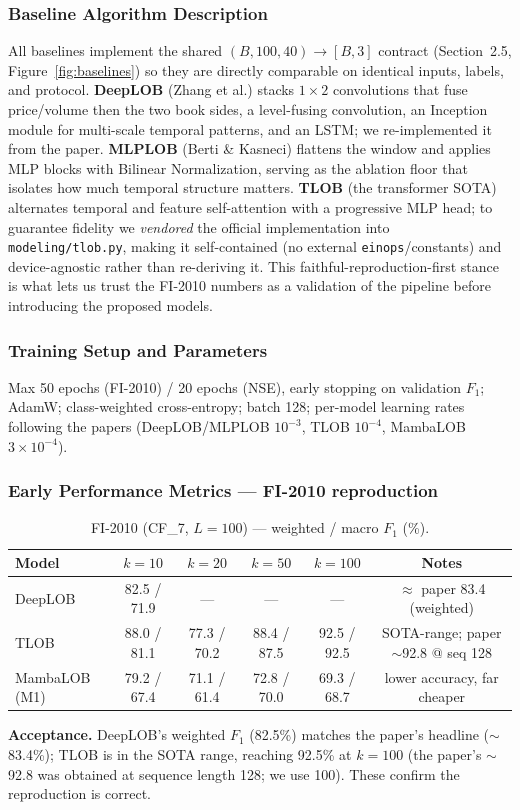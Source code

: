 \documentclass[11pt]{article}
\begin{document}
\subsubsection{Baseline Algorithm Description}
All baselines implement the shared $(B,100,40)\rightarrow[B,3]$ contract (Section~2.5, Figure~\ref{fig:baselines})
so they are directly comparable on identical inputs, labels, and protocol. \textbf{DeepLOB} (Zhang et al.)
stacks $1\times2$ convolutions that fuse price/volume then the two book sides, a level-fusing convolution, an
Inception module for multi-scale temporal patterns, and an LSTM; we re-implemented it from the paper.
\textbf{MLPLOB} (Berti \& Kasneci) flattens the window and applies MLP blocks with Bilinear Normalization,
serving as the ablation floor that isolates how much temporal structure matters. \textbf{TLOB} (the
transformer SOTA) alternates temporal and feature self-attention with a progressive MLP head; to guarantee
fidelity we \emph{vendored} the official implementation into \texttt{modeling/tlob.py}, making it
self-contained (no external \texttt{einops}/constants) and device-agnostic rather than re-deriving it. This
faithful-reproduction-first stance is what lets us trust the FI-2010 numbers as a validation of the pipeline
before introducing the proposed models.

\subsubsection{Training Setup and Parameters}
Max 50 epochs (FI-2010) / 20 epochs (NSE), early stopping on validation $F_1$; AdamW; class-weighted
cross-entropy; batch 128; per-model learning rates following the papers (DeepLOB/MLPLOB $10^{-3}$, TLOB
$10^{-4}$, MambaLOB $3\times10^{-4}$).

\subsubsection{Early Performance Metrics --- FI-2010 reproduction}
\begin{table}[h]
\centering
\caption{FI-2010 (CF\_7, $L=100$) --- weighted / macro $F_1$ (\%).}
\label{tab:fi2010}
\begin{tabular}{@{}lccccc@{}}
\toprule
Model & $k{=}10$ & $k{=}20$ & $k{=}50$ & $k{=}100$ & Notes \\
\midrule
DeepLOB & 82.5 / 71.9 & --- & --- & --- & $\approx$ paper 83.4 (weighted) \\
TLOB    & 88.0 / 81.1 & 77.3 / 70.2 & 88.4 / 87.5 & 92.5 / 92.5 & SOTA-range; paper $\sim$92.8 @ seq 128 \\
MambaLOB (M1) & 79.2 / 67.4 & 71.1 / 61.4 & 72.8 / 70.0 & 69.3 / 68.7 & lower accuracy, far cheaper \\
\bottomrule
\end{tabular}
\end{table}
\textbf{Acceptance.} DeepLOB's weighted $F_1$ (82.5\%) matches the paper's headline ($\sim$83.4\%); TLOB is
in the SOTA range, reaching 92.5\% at $k{=}100$ (the paper's $\sim$92.8 was obtained at sequence length
128; we use 100). These confirm the reproduction is correct.
\end{document}

